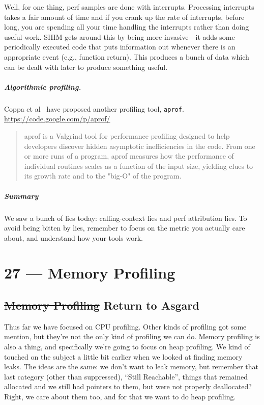\documentclass[a4paper]{report}
\begin{document}
Well, for one thing, perf samples are done with interrupts. Processing interrupts takes a fair amount of time and if you crank up the rate of interrupts, before long, you are spending all your time handling the interrupts rather than doing useful work. SHIM gets around this by being more invasive---it adds some periodically executed code that puts information out whenever there is an appropriate event (e.g., function return). This produces a bunch of data which can be dealt with later to produce something useful.

  \paragraph{Algorithmic profiling.} Coppa et al~\cite{coppa2014input} have proposed another profiling tool,
  {\tt aprof}.
  \url{https://code.google.com/p/aprof/}
{
  \begin{quote}
  aprof is a Valgrind tool for performance profiling designed to help developers discover hidden asymptotic inefficiencies in the code. From one or more runs of a program, aprof measures how the performance of individual routines scales as a function of the input size, yielding clues to its growth rate and to the "big-O" of the program.
  \end{quote}
  }

\paragraph{Summary} We saw a bunch of lies today: calling-context lies and perf attribution
lies. To avoid being bitten by lies, remember to focus on the metric you actually care about,
and understand how your tools work.










\chapter*{27 --- Memory Profiling}


\section*{\st{Memory Profiling} Return to Asgard}

Thus far we have focused on CPU profiling. Other kinds of profiling got some mention, but they're not the only kind of profiling we can do. Memory profiling is also a thing, and specifically we're going to focus on heap profiling. We kind of touched on the subject a little bit earlier when we looked at finding memory leaks. The ideas are the same: we don't want to leak memory, but remember that last category (other than suppressed), ``Still Reachable'', things that remained allocated and we still had pointers to them, but were not properly deallocated? Right, we care about them too, and for that we want to do heap profiling.
\end{document}
